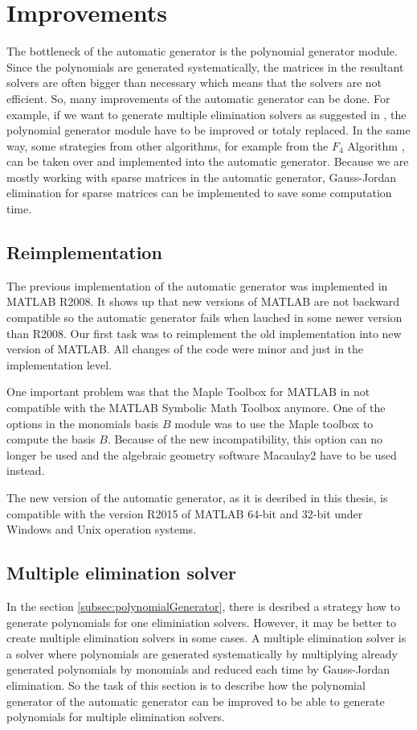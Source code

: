 \section{Improvements}
The bottleneck of the automatic generator is the polynomial generator module. Since the polynomials are generated systematically, the matrices in the resultant solvers are often bigger than necessary which means that the solvers are not efficient. So, many improvements of the automatic generator \cite{AutoGen} can be done. For example, if we want to generate multiple elimination solvers as suggested in \cite{KukelovaAlgMethods}, the polynomial generator module have to be improved or totaly replaced. In the same way, some strategies from other algorithms, for example from the $F_4$ Algorithm \cite{F4}, can be taken over and implemented into the automatic generator. Because we are mostly working with sparse matrices in the automatic generator, Gauss-Jordan elimination for sparse matrices can be implemented to save some computation time.

\subsection{Reimplementation}
The previous implementation \cite{AutoGen} of the automatic generator was implemented in MATLAB R2008. It shows up that new versions of MATLAB are not backward compatible so the automatic generator fails when lauched in some newer version than R2008. Our first task was to reimplement the old implementation into new version of MATLAB. All changes of the code were minor and just in the implementation level.

One important problem was that the Maple Toolbox for MATLAB in not compatible with the MATLAB Symbolic Math Toolbox anymore. One of the options in the monomials basis $B$ module was to use the Maple toolbox to compute the basis $B$. Because of the new incompatibility, this option can no longer be used and the algebraic geometry software Macaulay2 \cite{M2} have to be used instead.

The new version of the automatic generator, as it is desribed in this thesis, is compatible with the version R2015 of MATLAB 64-bit and 32-bit under Windows and Unix operation systems.

\subsection{Multiple elimination solver}
\label{subsec:multipleSolver}
In the section \ref{subsec:polynomialGenerator}, there is desribed a strategy how to generate polynomials for one eliminiation solvers. However, it may be better to create multiple elimination solvers in some cases. A multiple elimination solver is a solver where polynomials are generated systematically by multiplying already generated polynomials by monomials and reduced each time by Gauss-Jordan elimination. So the task of this section is to describe how the polynomial generator of the automatic generator can be improved to be able to generate polynomials for multiple elimination solvers.

